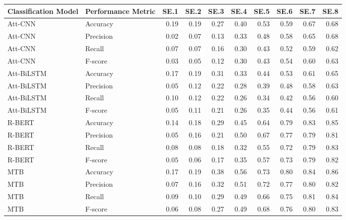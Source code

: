 \begin{tabular}{llrrrrrrrr}
\toprule
Classification Model & Performance Metric & SE.1 & SE.2 & SE.3 & SE.4 & SE.5 & SE.6 & SE.7 & SE.8 \\
\midrule
Att-CNN & Accuracy & 0.19 & 0.19 & 0.27 & 0.40 & 0.53 & 0.59 & 0.67 & 0.68 \\
Att-CNN & Precision & 0.02 & 0.07 & 0.13 & 0.33 & 0.48 & 0.58 & 0.65 & 0.68 \\
Att-CNN & Recall & 0.07 & 0.07 & 0.16 & 0.30 & 0.43 & 0.52 & 0.59 & 0.62 \\
Att-CNN & F-score & 0.03 & 0.05 & 0.12 & 0.30 & 0.43 & 0.54 & 0.60 & 0.63 \\
Att-BiLSTM & Accuracy & 0.17 & 0.19 & 0.31 & 0.33 & 0.44 & 0.53 & 0.61 & 0.65 \\
Att-BiLSTM & Precision & 0.05 & 0.12 & 0.22 & 0.28 & 0.39 & 0.48 & 0.58 & 0.63 \\
Att-BiLSTM & Recall & 0.10 & 0.12 & 0.22 & 0.26 & 0.34 & 0.42 & 0.56 & 0.60 \\
Att-BiLSTM & F-score & 0.05 & 0.11 & 0.21 & 0.26 & 0.35 & 0.44 & 0.56 & 0.61 \\
R-BERT & Accuracy & 0.14 & 0.18 & 0.29 & 0.45 & 0.64 & 0.79 & 0.83 & 0.85 \\
R-BERT & Precision & 0.05 & 0.16 & 0.21 & 0.50 & 0.67 & 0.77 & 0.79 & 0.81 \\
R-BERT & Recall & 0.08 & 0.08 & 0.18 & 0.32 & 0.55 & 0.72 & 0.79 & 0.83 \\
R-BERT & F-score & 0.05 & 0.06 & 0.17 & 0.35 & 0.57 & 0.73 & 0.79 & 0.82 \\
MTB & Accuracy & 0.17 & 0.19 & 0.38 & 0.56 & 0.73 & 0.80 & 0.84 & 0.86 \\
MTB & Precision & 0.07 & 0.16 & 0.32 & 0.51 & 0.72 & 0.77 & 0.80 & 0.82 \\
MTB & Recall & 0.09 & 0.10 & 0.29 & 0.49 & 0.66 & 0.75 & 0.81 & 0.84 \\
MTB & F-score & 0.06 & 0.08 & 0.27 & 0.49 & 0.68 & 0.76 & 0.80 & 0.83 \\
\bottomrule
\end{tabular}
